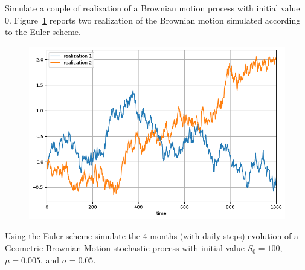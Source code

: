 \documentclass[12pt,a4paper]{book}
\begin{document}
%
%

\begin{question}[subtitle=Brownian Motion  (\texttt{python})]
Simulate a couple of realization of a Brownian motion process with initial value 0.
Figure~\ref{fig:brownian_motion} reports two realization of the Brownian motion simulated according to the Euler scheme.
\end{question}
\begin{solution}
\begin{figure}[htbp]
\begin{center}
\includegraphics[width=0.5\linewidth]{addons/brownian_motion}
\end{center}
\label{fig:brownian_motion}
\end{figure}
\end{solution}

\begin{question}[subtitle=Geometric Brownian Motion  (\texttt{python})]
Using the Euler scheme simulate the 4-months (with daily steps) evolution of a Geometric Brownian Motion stochastic process with initial value $S_0=100$, $\mu=0.005$, and $\sigma=0.05$.
\end{question}
\end{document}
